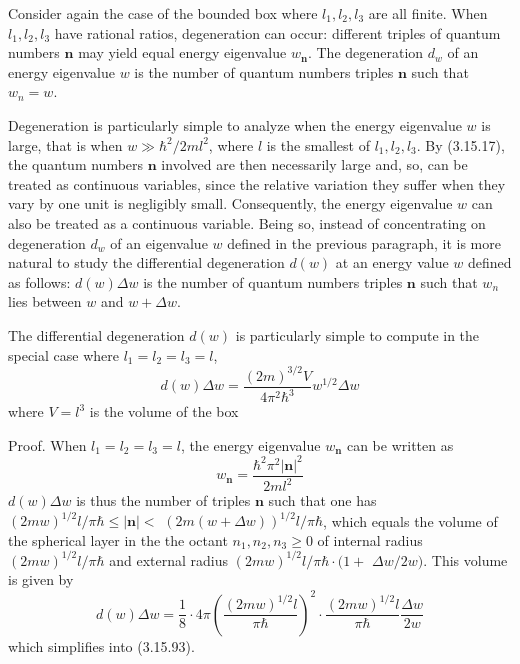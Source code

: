 \documentclass{article}
\begin{document}
Consider again the case of the bounded box where $l_{1}, l_{2}, l_{3}$ are all finite. When $l_{1}, l_{2}, l_{3}$ have rational ratios, degeneration can occur: different triples of quantum numbers $\boldsymbol{n}$ may yield equal energy eigenvalue $w_{\boldsymbol{n}}$. The degeneration $d_{w}$ of an energy eigenvalue $w$ is the number of quantum numbers triples $\boldsymbol{n}$ such that $w_{n}=w$.

Degeneration is particularly simple to analyze when the energy eigenvalue $w$ is large, that is when $w \gg \hbar^{2} / 2 m l^{2}$, where $l$ is the smallest of $l_{1}, l_{2}, l_{3}$. By (3.15.17), the quantum numbers $\boldsymbol{n}$ involved are then necessarily large and, so, can be treated as continuous variables, since the relative variation they suffer when they vary by one unit is negligibly small. Consequently, the energy eigenvalue $w$ can also be treated as a continuous variable. Being so, instead of concentrating on degeneration $d_{w}$ of an eigenvalue $w$ defined in the previous paragraph, it is more natural to study the differential degeneration $d(w)$ at an energy value $w$ defined as follows: $d(w) \Delta w$ is the number of quantum numbers triples $\boldsymbol{n}$ such that $w_{n}$ lies between $w$ and $w+\Delta w$.

The differential degeneration $d(w)$ is particularly simple to compute in the special case where $l_{1}=l_{2}=l_{3}=l$,
$$
\begin{equation*}
d(w) \Delta w=\frac{(2 m)^{3 / 2} V}{4 \pi^{2} \hbar^{3}} w^{1 / 2} \Delta w \tag{3.15.93}
\end{equation*}
$$
where $V=l^{3}$ is the volume of the box

Proof. When $l_{1}=l_{2}=l_{3}=l$, the energy eigenvalue $w_{\boldsymbol{n}}$ can be written as
$$
\begin{equation*}
w_{\boldsymbol{n}}=\frac{\hbar^{2} \pi^{2}|\boldsymbol{n}|^{2}}{2 m l^{2}} \tag{3.15.94}
\end{equation*}
$$
$d(w) \Delta w$ is thus the number of triples $\boldsymbol{n}$ such that one has $(2 m w)^{1 / 2} l / \pi \hbar \leq|\boldsymbol{n}|<$ $(2 m(w+\Delta w))^{1 / 2} l / \pi \hbar$, which equals the volume of the spherical layer in the the octant $n_{1}, n_{2}, n_{3} \geq 0$ of internal radius $(2 m w)^{1 / 2} l / \pi \hbar$ and external radius $(2 m w)^{1 / 2} l / \pi \hbar \cdot(1+$ $\Delta w / 2 w)$. This volume is given by
$$
\begin{equation*}
d(w) \Delta w=\frac{1}{8} \cdot 4 \pi\left(\frac{(2 m w)^{1 / 2} l}{\pi \hbar}\right)^{2} \cdot \frac{(2 m w)^{1 / 2} l}{\pi \hbar} \frac{\Delta w}{2 w} \tag{3.15.95}
\end{equation*}
$$
which simplifies into (3.15.93).
\end{document}
